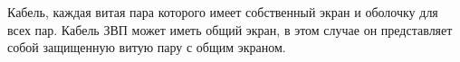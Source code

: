 Кабель, каждая витая пара которого имеет собственный экран 
и оболочку для всех пар. Кабель ЗВП может иметь общий экран, в 
этом случае он представляет собой защищенную витую пару с общим
экраном.